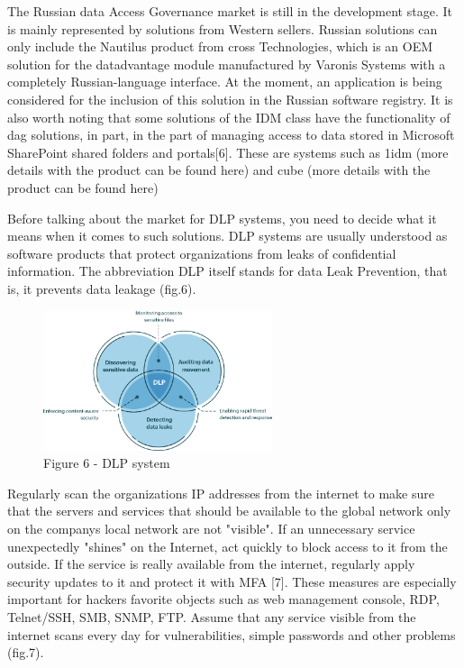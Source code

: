 \begin{multicols}{2}
The Russian data Access Governance market is still in the development
stage. It is mainly represented by solutions from Western sellers.
Russian solutions can only include the Nautilus product from cross
Technologies, which is an OEM solution for the datadvantage module
manufactured by Varonis Systems with a completely Russian-language
interface. At the moment, an application is being considered for the
inclusion of this solution in the Russian software registry. It is also
worth noting that some solutions of the IDM class have the functionality
of dag solutions, in part, in the part of managing access to data stored
in Microsoft SharePoint shared folders and portals{[}6{]}. These are
systems such as 1idm (more details with the product can be found here)
and cube (more details with the product can be found here)

Before talking about the market for DLP systems, you need to decide what
it means when it comes to such solutions. DLP systems are usually
understood as software products that protect organizations from leaks of
confidential information. The abbreviation DLP itself stands for data
Leak Prevention, that is, it prevents data leakage (fig.6).
\end{multicols}

\begin{figure}[H]
	\centering
	\includegraphics[width=0.6\textwidth]{assets/68}
	\caption*{Figure 6 - DLP system}
\end{figure}

\begin{multicols}{2}
Regularly scan the organization\textquotesingle s IP addresses from the
internet to make sure that the servers and services that should be
available to the global network only on the company\textquotesingle s
local network are not "visible". If an unnecessary service unexpectedly
"shines" on the Internet, act quickly to block access to it from the
outside. If the service is really available from the internet, regularly
apply security updates to it and protect it with MFA {[}7{]}. These
measures are especially important for hackers \textquotesingle{}
favorite objects such as web management console, RDP, Telnet/SSH, SMB,
SNMP, FTP. Assume that any service visible from the internet scans every
day for vulnerabilities, simple passwords and other problems (fig.7).
\end{multicols}

